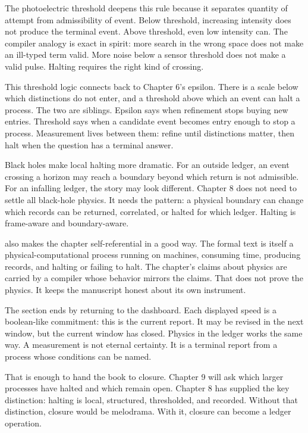 The photoelectric threshold deepens this rule because it separates quantity of
attempt from admissibility of event. Below threshold, increasing intensity does
not produce the terminal event. Above threshold, even low intensity can. The
compiler analogy is exact in spirit: more search in the wrong space does not
make an ill-typed term valid. More noise below a sensor threshold does not make
a valid pulse. Halting requires the right kind of crossing.

This threshold logic connects back to Chapter 6's epsilon. There is a scale
below which distinctions do not enter, and a threshold above which an event can
halt a process. The two are siblings. Epsilon says when refinement stops
buying new entries. Threshold says when a candidate event becomes entry enough
to stop a process. Measurement lives between them: refine until distinctions
matter, then halt when the question has a terminal answer.

Black holes make local halting more dramatic. For an outside ledger, an event
crossing a horizon may reach a boundary beyond which return is not admissible.
For an infalling ledger, the story may look different. Chapter 8 does not need
to settle all black-hole physics. It needs the pattern: a physical boundary can
change which records can be returned, correlated, or halted for which ledger.
Halting is frame-aware and boundary-aware.

 also makes the chapter self-referential in a good
way. The formal text is itself a physical-computational process running on
machines, consuming time, producing records, and halting or failing to halt.
The chapter's claims about physics are carried by a compiler whose behavior
mirrors the claims. That does not prove the physics. It keeps the manuscript
honest about its own instrument.

The section ends by returning to the dashboard. Each displayed speed is a
boolean-like commitment: this is the current report. It may be revised in the
next window, but the current window has closed. Physics in the ledger works the
same way. A measurement is not eternal certainty. It is a terminal report from
a process whose conditions can be named.

That is enough to hand the book to closure. Chapter 9 will ask which larger
processes have halted and which remain open. Chapter 8 has supplied the key
distinction: halting is local, structured, thresholded, and recorded. Without
that distinction, closure would be melodrama. With it, closure can become a
ledger operation.

